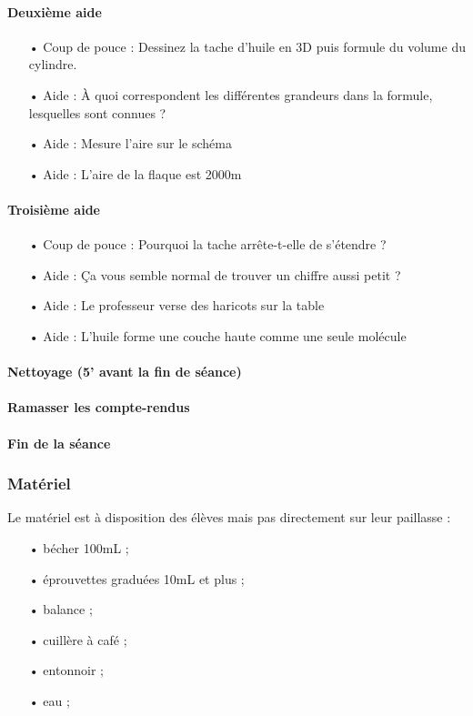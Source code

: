 \documentclass[12pt,a4paper]{article}
\begin{document}
\paragraph{Deuxième aide}
\begin{itemize}
\item[•] Coup de pouce : Dessinez la tache d'huile en 3D puis formule du volume du cylindre.
\item[•] Aide : À quoi correspondent les différentes grandeurs dans la formule, lesquelles sont connues ?
\item[•] Aide : Mesure l'aire sur le schéma
\item[•] Aide : L'aire de la flaque est \unit{2000}{m\squared}
\end{itemize}

\paragraph{Troisième aide}
\begin{itemize}
\item[•] Coup de pouce : Pourquoi la tache arrête-t-elle de s'étendre ?
\item[•] Aide : Ça vous semble normal de trouver un chiffre aussi petit ?
\item[•] Aide : Le professeur verse des haricots sur la table
\item[•] Aide : L'huile forme une couche haute comme une seule molécule
\end{itemize}

\paragraph{Nettoyage (5' avant la fin de séance)}

\paragraph{Ramasser les compte-rendus}
 
\paragraph{Fin de la séance}

\subsubsection{Matériel}

Le matériel est à disposition des élèves mais pas directement sur leur paillasse :
\begin{itemize}
\item[•] bécher \unit{100}{mL} ;
\item[•] éprouvettes graduées \unit{10}{mL} et plus ;
\item[•] balance ;
\item[•] cuillère à café ;
\item[•] entonnoir ;
\item[•] eau ;
\end{itemize}
\end{document}
